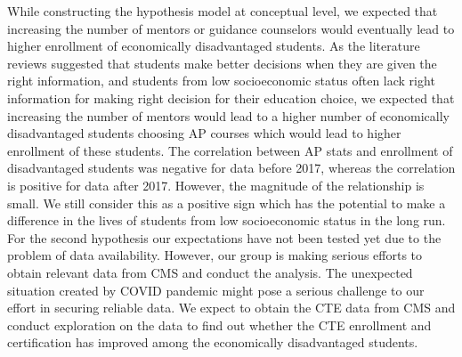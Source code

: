 While constructing the hypothesis model at conceptual level, we expected that increasing the number of mentors or guidance counselors would eventually lead to higher enrollment of economically disadvantaged students. 
As the literature reviews suggested that students make better decisions when they are given the right information, and students from low socioeconomic status often lack right information for making right decision for their education choice,  we expected that increasing the number of  mentors would lead to a higher number of economically disadvantaged students choosing AP courses which would lead to higher enrollment of these students. The correlation between AP stats and enrollment of disadvantaged students was negative for data before 2017, whereas the correlation is positive for data after 2017. However, the magnitude of the relationship is small. We still  consider this as a positive sign which has the potential to make a difference in the lives of students from low socioeconomic status in the long run. For the second hypothesis our expectations have not been tested yet due to the problem of data availability. However, our group is making serious efforts to obtain relevant data from CMS and conduct the analysis. The unexpected situation created by COVID pandemic might pose a serious challenge to our effort in securing reliable data. We expect to obtain the CTE data from CMS and conduct exploration on the data to find out whether the CTE enrollment and certification has improved among the economically disadvantaged students. 





